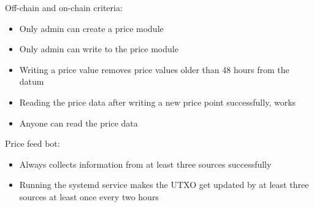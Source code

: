 \documentclass{article} %
\begin{document}
Off-chain and on-chain criteria:
\begin{itemize}
  \item Only admin can create a price module
  \item Only admin can write to the price module
  \item Writing a price value removes price values older than 48 hours from the
    datum
  \item Reading the price data after writing a new price point successfully,
    works
  \item Anyone can read the price data
\end{itemize}

Price feed bot:
\begin{itemize}
  \item Always collects information from at least three sources successfully
  \item Running the systemd service makes the UTXO get updated by at least three
    sources at least once every two hours
\end{itemize}

% 
% 
% 
% 
\end{document}
